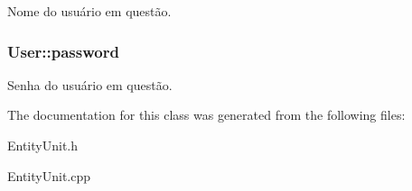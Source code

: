 Nome do usuário em questão. 

\hypertarget{classUser_a84c5ed822199a90e753ebfc54262fde8}{
\subsubsection[{password}]{ User\-::password\hspace{0.3cm}{\ttfamily [protected]}}}\label{d9/dc0/classUser_a84c5ed822199a90e753ebfc54262fde8}


Senha do usuário em questão. 



The documentation for this class was generated from the following files\-:\begin{DoxyCompactItemize}
\item 
Entity\-Unit.\-h\item 
Entity\-Unit.\-cpp\end{DoxyCompactItemize}
